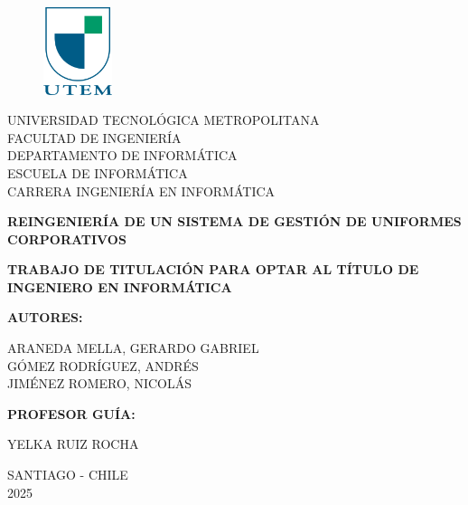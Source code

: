 \begin{titlepage}
    \begin{figure}
        \includegraphics[width=2cm]{figuras/logo_utem.png}
    \end{figure}

    {
        \noindent UNIVERSIDAD TECNOLÓGICA METROPOLITANA\\
        FACULTAD DE INGENIERÍA\\
        DEPARTAMENTO DE INFORMÁTICA\\
        ESCUELA DE INFORMÁTICA\\
        CARRERA INGENIERÍA EN INFORMÁTICA
        \vfill
    }

    \begin{center}
        \textbf{\Large REINGENIERÍA DE UN SISTEMA DE GESTIÓN DE UNIFORMES CORPORATIVOS} 
    \end{center}

    \vfill
    
    \begin{center}
        \textbf{\large TRABAJO DE TITULACIÓN PARA OPTAR AL TÍTULO DE INGENIERO EN INFORMÁTICA} 
    \end{center}
        
    \vfill

    \begin{flushright}
        \textbf{\large AUTORES:} 

        ARANEDA MELLA, GERARDO GABRIEL \\
        GÓMEZ RODRÍGUEZ, ANDRÉS \\
        JIMÉNEZ ROMERO, NICOLÁS 
        
        \textbf{\large PROFESOR GUÍA:}
        
        YELKA RUIZ ROCHA
        
    \end{flushright}
    
    \vspace{0.5in}

    \begin{center}
        \small SANTIAGO - CHILE \\
        2025
    \end{center}

\end{titlepage}
